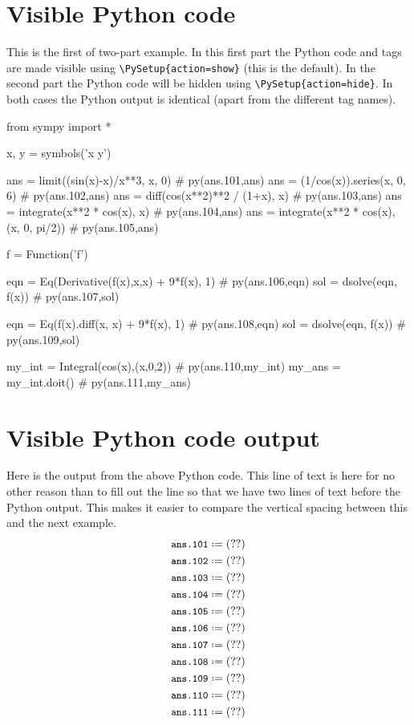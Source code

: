 \documentclass[12pt]{pylatex}
\begin{document}
\section*{Visible Python code}

This is the first of two-part example. In this first part the Python code and tags are made visible using {\tt\small\verb|\PySetup{action=show}|} (this is the default). In the second part the Python code will be hidden using {\tt\small\verb|\PySetup{action=hide}|}. In both cases the Python output is identical (apart from the different tag names).

\vspace{12pt}


\begin{python}
   from sympy import *

   x, y = symbols('x y')

   ans = limit((sin(x)-x)/x**3, x, 0)               # py(ans.101,ans)
   ans = (1/cos(x)).series(x, 0, 6)                 # py(ans.102,ans)
   ans = diff(cos(x**2)**2 / (1+x), x)              # py(ans.103,ans)
   ans = integrate(x**2 * cos(x), x)                # py(ans.104,ans)
   ans = integrate(x**2 * cos(x), (x, 0, pi/2))     # py(ans.105,ans)

   f = Function('f')

   eqn = Eq(Derivative(f(x),x,x) + 9*f(x), 1)       # py(ans.106,eqn)
   sol = dsolve(eqn, f(x))                          # py(ans.107,sol)

   eqn = Eq(f(x).diff(x, x) + 9*f(x), 1)            # py(ans.108,eqn)
   sol = dsolve(eqn, f(x))                          # py(ans.109,sol)

   my_int = Integral(cos(x),(x,0,2))                # py(ans.110,my_int)
   my_ans = my_int.doit()                           # py(ans.111,my_ans)
\end{python}

\clearpage

\section*{Visible Python code output}

Here is the output from the above Python code. This line of text is here for no other reason than to fill out the line so that we have two lines of text before the Python output. This makes it easier to compare the vertical spacing between this and the next example.
%
\begin{align*}
   &\py*{ans.101}\\
   &\py*{ans.102}\\
   &\py*{ans.103}\\
   &\py*{ans.104}\\
   &\py*{ans.105}\\
   &\py*{ans.106}\\
   &\py*{ans.107}\\
   &\py*{ans.108}\\
   &\py*{ans.109}\\
   &\py*{ans.110}\\
   &\py*{ans.111}
\end{align*}
\end{document}
